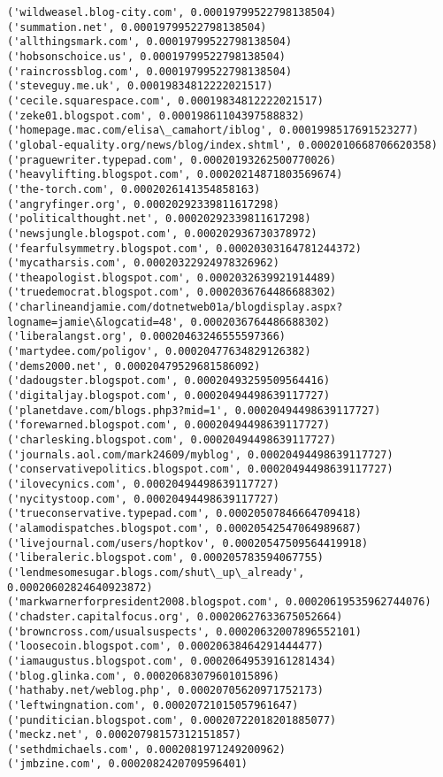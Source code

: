 \documentclass[11pt]{article}
\begin{document}
\begin{Verbatim}[commandchars=\\\{\}]
('wildweasel.blog-city.com', 0.00019799522798138504)
('summation.net', 0.00019799522798138504)
('allthingsmark.com', 0.00019799522798138504)
('hobsonschoice.us', 0.00019799522798138504)
('raincrossblog.com', 0.00019799522798138504)
('steveguy.me.uk', 0.00019834812222021517)
('cecile.squarespace.com', 0.00019834812222021517)
('zeke01.blogspot.com', 0.00019861104397588832)
('homepage.mac.com/elisa\_camahort/iblog', 0.0001998517691523277)
('global-equality.org/news/blog/index.shtml', 0.0002010668706620358)
('praguewriter.typepad.com', 0.00020193262500770026)
('heavylifting.blogspot.com', 0.00020214871803569674)
('the-torch.com', 0.0002026141354858163)
('angryfinger.org', 0.00020292339811617298)
('politicalthought.net', 0.00020292339811617298)
('newsjungle.blogspot.com', 0.000202936730378972)
('fearfulsymmetry.blogspot.com', 0.00020303164781244372)
('mycatharsis.com', 0.00020322924978326962)
('theapologist.blogspot.com', 0.0002032639921914489)
('truedemocrat.blogspot.com', 0.0002036764486688302)
('charlineandjamie.com/dotnetweb01a/blogdisplay.aspx?logname=jamie\&logcatid=48', 0.0002036764486688302)
('liberalangst.org', 0.00020463246555597366)
('martydee.com/poligov', 0.00020477634829126382)
('dems2000.net', 0.00020479529681586092)
('dadougster.blogspot.com', 0.00020493259509564416)
('digitaljay.blogspot.com', 0.00020494498639117727)
('planetdave.com/blogs.php3?mid=1', 0.00020494498639117727)
('forewarned.blogspot.com', 0.00020494498639117727)
('charlesking.blogspot.com', 0.00020494498639117727)
('journals.aol.com/mark24609/myblog', 0.00020494498639117727)
('conservativepolitics.blogspot.com', 0.00020494498639117727)
('ilovecynics.com', 0.00020494498639117727)
('nycitystoop.com', 0.00020494498639117727)
('trueconservative.typepad.com', 0.00020507846664709418)
('alamodispatches.blogspot.com', 0.00020542547064989687)
('livejournal.com/users/hoptkov', 0.00020547509564419918)
('liberaleric.blogspot.com', 0.000205783594067755)
('lendmesomesugar.blogs.com/shut\_up\_already', 0.00020602824640923872)
('markwarnerforpresident2008.blogspot.com', 0.00020619535962744076)
('chadster.capitalfocus.org', 0.00020627633675052664)
('browncross.com/usualsuspects', 0.00020632007896552101)
('loosecoin.blogspot.com', 0.00020638464291444477)
('iamaugustus.blogspot.com', 0.00020649539161281434)
('blog.glinka.com', 0.00020683079601015896)
('hathaby.net/weblog.php', 0.00020705620971752173)
('leftwingnation.com', 0.00020721015057961647)
('punditician.blogspot.com', 0.00020722018201885077)
('meckz.net', 0.00020798157312151857)
('sethdmichaels.com', 0.0002081971249200962)
('jmbzine.com', 0.0002082420709596401)

\end{Verbatim}
\end{document}
